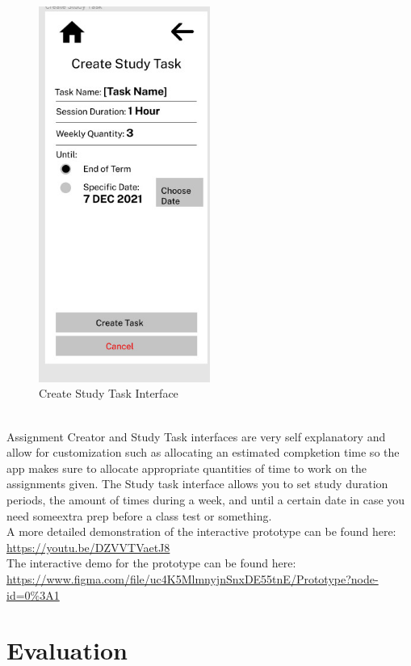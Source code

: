 \documentclass{article}
\begin{document}
\begin{figure}[h!]
\begin{minipage}{0.5\textwidth}
			\includegraphics[width=0.5\textwidth]{createstudy.jpg}
			\caption{Create Study Task Interface}
		\end{minipage}
	\end{figure} 
	\\Assignment Creator and Study Task interfaces are very self explanatory and allow for customization such as allocating an estimated compketion time so the app makes sure to allocate appropriate quantities of time to work on the assignments given. The Study task interface allows you to set study duration periods, the amount of times during a week, and until a certain date in case you need someextra prep before a class test or something. \\
	A more detailed demonstration of the interactive prototype can be found here: \href{https://youtu.be/DZVVTVaetJ8}{https://youtu.be/DZVVTVaetJ8}\\
	The interactive demo for the prototype can be found here:\\ \href{https://www.figma.com/file/uc4K5MlmnyjnSnxDE55tnE/Prototype?node-id=0%3A1}{https://www.figma.com/file/uc4K5MlmnyjnSnxDE55tnE/Prototype?node-id=0\%3A1}
	
	\section{Evaluation}
\end{document}

